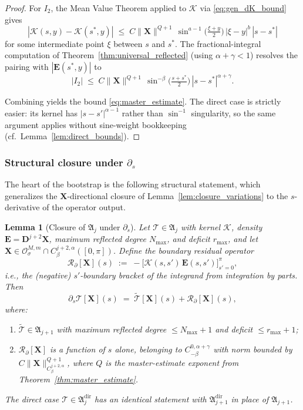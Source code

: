 \documentclass{amsart}
\newtheorem{lemma}[theorem]{Lemma}
\begin{document}
\begin{proof}
For $I_2$, the Mean Value Theorem applied to $\mathcal{K}$ via \eqref{eq:gen_dK_bound} gives
\[
|\mathcal{K}(s, y) - \mathcal{K}(s^*, y)| \;\le\; C\|\mathbf{X}\|^{Q+1}\,
\sin^{a-1}\!\bigl(\tfrac{\xi+y}{2}\bigr)\,|\xi-y|^{b}\,|s-s^*|
\]
for some intermediate point $\xi$ between $s$ and $s^*$. The fractional-integral computation of Theorem~\ref{thm:universal_reflected} (using $\alpha + \gamma < 1$) resolves the pairing with $|\mathbf{E}(s^*, y)|$ to
\[
|I_2| \;\le\; C\|\mathbf{X}\|^{Q+1}\,\sin^{-\beta}\!\bigl(\tfrac{s+s^*}{2}\bigr)\,|s-s^*|^{\alpha+\gamma}.
\]

Combining yields the bound \eqref{eq:master_estimate}. The direct case is strictly easier: its kernel has $|s-s'|^{\alpha-1}$ rather than $\sin^{-1}$ singularity, so the same argument applies without sine-weight bookkeeping (cf.\ Lemma~\ref{lem:direct_bounds}).
\end{proof}

\subsubsection{Structural closure under $\partial_s$}

The heart of the bootstrap is the following structural statement, which generalizes the $\mathbf{X}$-directional closure of Lemma~\ref{lem:closure_variations} to the $s$-derivative of the operator output.

\begin{lemma}[Closure of $\mathfrak{A}_j$ under $\partial_s$]\label{lem:closure_ds}
Let $\mathcal{T} \in \mathfrak{A}_j$ with kernel $\mathcal{K}$, density $\mathbf{E} = \mathbf{D}^{j+2}\mathbf{X}$, maximum reflected degree $N_{\max}$, and deficit $r_{\max}$, and let $\mathbf{X} \in \mathcal{O}^{M,m}_\sigma \cap C^{j+2,\alpha}_\beta([0,\pi])$.  Define the boundary residual operator
\begin{equation}\label{eq:R_partial_def}
\mathcal{R}_\partial[\mathbf{X}](s)
 \;:=\; -\bigl[\mathcal{K}(s,s')\,\mathbf{E}(s,s')\bigr]_{s'=0}^{\pi},
\end{equation}
i.e., the (negative) $s'$-boundary bracket of the integrand from integration by parts. Then
\begin{equation}\label{eq:closure_decomposition}
\partial_s\mathcal{T}[\mathbf{X}](s)
 \;=\; \widetilde{\mathcal{T}}[\mathbf{X}](s) + \mathcal{R}_\partial[\mathbf{X}](s),
\end{equation}
where:
\begin{enumerate}
\item[\textup{(a)}] $\widetilde{\mathcal{T}} \in \mathfrak{A}_{j+1}$ with maximum reflected degree $\le N_{\max}+1$ and deficit $\le r_{\max}+1$;
\item[\textup{(b)}] $\mathcal{R}_\partial[\mathbf{X}]$ is a function of $s$ alone, belonging to $C^{0,\alpha+\gamma}_{-\beta}$ with norm bounded by $C\|\mathbf{X}\|_{C^{j+2,\alpha}_\beta}^{Q+1}$, where $Q$ is the master-estimate exponent from Theorem~\ref{thm:master_estimate}.
\end{enumerate}
The direct case $\mathcal{T} \in \mathfrak{A}_j^{\mathrm{dir}}$ has an identical statement with $\mathfrak{A}_{j+1}^{\mathrm{dir}}$ in place of $\mathfrak{A}_{j+1}$.
\end{lemma}
\end{document}

